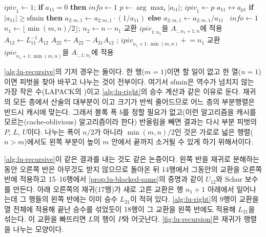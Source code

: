 \begin{algorithm}[htbp]
\begin{algorithmic}[1]
    \State $\mathit{ipiv}_1\gets1$; \textbf{if} $a_{11}=0$ \textbf{then} $\mathit{info}\gets1$
   
    \State $p\gets\arg\max_i|a_{i1}|$; $\mathit{ipiv}_1\gets p$
      \State $a_{11}\leftrightarrow a_{p1}$
      \State \textbf{if} $|a_{11}|\ge\mathrm{sfmin}$ \textbf{then} $a_{2:m,1}\gets a_{2:m,1}\cdot(1/a_{11})$ \textbf{else} $a_{2:m,1}\gets a_{2:m,1}/a_{11}$
    \Else\ $\mathit{info}\gets1$
    \EndIf
  \Else
    \State $n_1\gets\lfloor\min(m,n)/2\rfloor$; $n_2\gets n-n_1$
    \State {} 
    \State 교환 $\mathit{ipiv}_{1:n_1}$을 $A_{:,n_1+1:n}$에 적용 
    \State $A_{12}\gets L_{11}^{-1}A_{12}$ 
    \State $A_{22}\gets A_{22}-A_{21}A_{12}$ 
    \State {}; $\mathit{ipiv}_{n_1+1:\min(m,n)}\mathrel{+}=n_1$ 
    \State 교환 $\mathit{ipiv}_{n_1+1:\min(m,n)}$을 $A_{:,1:n_1}$에 적용 
  \EndIf
\EndFunction
\end{algorithmic}
\caption{재귀 LU (LAPACK )}
\label{alg:lu-recursive}
\end{algorithm}

\cref{alg:lu-recursive}의 기저 경우는 둘이다. 한 행($m=1$)이면 할 일이 없고 한 열($n=1$)이면 피벗을 찾아 바꾸고 나누는 것이 전부이다. 여기서 $\mathrm{sfmin}$은 역수가 넘치지 않는 가장 작은 수(LAPACK의 )이고 \cref{alg:lu-right}의 승수 계산과 같은 이유로 둔다. 재귀의 모든 층에서 산술의 대부분이 이고 크기가 반씩 줄어드므로 어느 층의 부분행렬은 반드시 캐시에 맞는다. 그래서 블록 폭 $b$를 정할 필요가 없고(이런 알고리즘을 캐시를 모르는(cache-oblivious) 알고리즘이라 한다) 반올림을 빼면 결과는 다시 부분 피벗의 $P$, $L$, $U$이다. 나누는 폭이 $n/2$가 아니라 $\min(m,n)/2$인 것은 가로로 넓은 행렬($n>m$)에서도 왼쪽 부분이 높이 $m$ 안에서 끝까지 소거될 수 있게 하기 위해서이다.

\cref{alg:lu-recursive}이 같은 결과를 내는 것도 같은 논증이다. 왼쪽 반을 재귀로 분해하는 동안 오른쪽 반은 아무것도 받지 않으므로 돌아온 뒤 14행에서 그동안의 교환을 오른쪽 반에 적용하고 15--16행에서 \cref{prop:lu-blocked-same}의 증명과 같이 $U_{12}$와 Schur 보수를 만든다. 아래 오른쪽의 재귀(17행)가 새로 고른 교환은 행 $n_1+1$ 아래에서 일어나는데 그 행들의 왼쪽 반에는 이미 승수 $L_{21}$이 적혀 있다. \cref{alg:lu-right}의 9행이 교환을 열 전체에 적용해 끝난 승수를 섞었듯이 18행이 그 교환을 왼쪽 반에도 적용해 $L_{21}$을 섞는다. 이 교환을 빠뜨리면 $L$의 행이 $P$와 어긋난다. \cref{fig:lu-recursion}은 재귀가 행렬을 나누는 모양이다.

